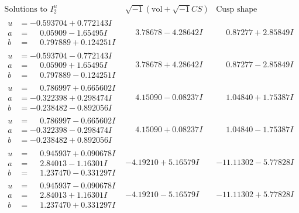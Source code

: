 \documentclass[1p]{elsarticle_modified}
\theoremstyle{definition}
\newcommand{\I}{\sqrt{-1}}
\begin{document}
$$\begin{array}{c|c|c}  
\text{Solutions to }I^u_{2}& \I (\text{vol} + \sqrt{-1}CS) & \text{Cusp shape}\\
 \hline 
\begin{aligned}
u &= -0.593704 + 0.772143 I \\
a &= \phantom{-}0.05909 - 1.65495 I \\
b &= \phantom{-}0.797889 + 0.124251 I\end{aligned}
 & \phantom{-}3.78678 - 4.28642 I & \phantom{-}0.87277 + 2.85849 I \\ \hline\begin{aligned}
u &= -0.593704 - 0.772143 I \\
a &= \phantom{-}0.05909 + 1.65495 I \\
b &= \phantom{-}0.797889 - 0.124251 I\end{aligned}
 & \phantom{-}3.78678 + 4.28642 I & \phantom{-}0.87277 - 2.85849 I \\ \hline\begin{aligned}
u &= \phantom{-}0.786997 + 0.665602 I \\
a &= -0.322398 + 0.298474 I \\
b &= -0.238482 - 0.892056 I\end{aligned}
 & \phantom{-}4.15090 - 0.08237 I & \phantom{-}1.04840 + 1.75387 I \\ \hline\begin{aligned}
u &= \phantom{-}0.786997 - 0.665602 I \\
a &= -0.322398 - 0.298474 I \\
b &= -0.238482 + 0.892056 I\end{aligned}
 & \phantom{-}4.15090 + 0.08237 I & \phantom{-}1.04840 - 1.75387 I \\ \hline\begin{aligned}
u &= \phantom{-}0.945937 + 0.090678 I \\
a &= \phantom{-}2.84013 - 1.16301 I \\
b &= \phantom{-}1.237470 - 0.331297 I\end{aligned}
 & -4.19210 + 5.16579 I & -11.11302 - 5.77828 I \\ \hline\begin{aligned}
u &= \phantom{-}0.945937 - 0.090678 I \\
a &= \phantom{-}2.84013 + 1.16301 I \\
b &= \phantom{-}1.237470 + 0.331297 I\end{aligned}
 & -4.19210 - 5.16579 I & -11.11302 + 5.77828 I \\ \hline\begin{aligned}

\end{aligned}
\end{array}$$
\end{document}
